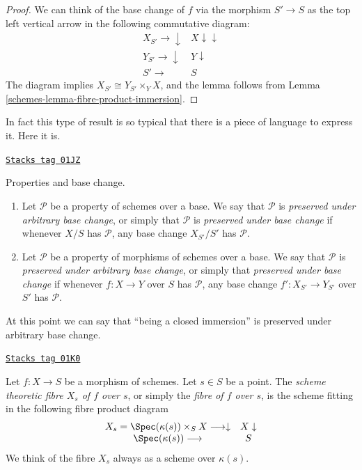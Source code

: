 \begin{proof}

We can think of the base change of $f$ via the morphism
$S' \to S$ as the top left vertical arrow in the following
commutative diagram:
$$
\begin{array}{cc}X_{S'} \longrightarrow\downarrow & X \downarrow\downarrow \\ Y_{S'} \longrightarrow\downarrow & Y \downarrow \\ S' \longrightarrow & S\end{array}
$$
The diagram implies $X_{S'} \cong Y_{S'} \times_Y X$,
and the lemma follows from Lemma \ref{schemes-lemma-fibre-product-immersion}.
\end{proof}

In fact this type of result is so typical that there is a
piece of language to express it. Here it is.

\begin{definition}
\label{schemes-definition-preserved-by-base-change}
\href{https://stacks.math.columbia.edu/tag/01JZ}{\texttt{Stacks tag 01JZ}}

Properties and base change.
\begin{enumerate}
\item Let $\mathcal{P}$ be a property of schemes over a base.
We say that $\mathcal{P}$ is {\it preserved under arbitrary base change},
or simply that $\mathcal{P}$ is {\it preserved under base change}
if whenever $X/S$
has $\mathcal{P}$, any base change $X_{S'}/S'$ has $\mathcal{P}$.
\item Let $\mathcal{P}$ be a property of morphisms of schemes over a base.
We say that $\mathcal{P}$ is {\it preserved under arbitrary base change},
or simply that {\it preserved under base change} if whenever
$f : X \to Y$ over $S$ has $\mathcal{P}$, any base change
$f' : X_{S'} \to Y_{S'}$ over $S'$ has $\mathcal{P}$.
\end{enumerate}
\end{definition}

At this point we can say that ``being a closed immersion'' is
preserved under arbitrary base change.

\begin{definition}[Fibre]
\label{schemes-definition-fibre}
\href{https://stacks.math.columbia.edu/tag/01K0}{\texttt{Stacks tag 01K0}}

Let $f : X \to S$ be a morphism of schemes.
Let $s \in S$ be a point.
The {\it scheme theoretic fibre $X_s$ of $f$ over $s$},
or simply the {\it fibre of $f$ over $s$},
is the scheme fitting in the following fibre product diagram
$$
\begin{array}{cc}X_s = \Spec(\kappa(s)) \times_S X \longrightarrow\downarrow & X \downarrow \\ \Spec(\kappa(s)) \longrightarrow & S\end{array}
$$
We think of the fibre $X_s$ always as a scheme over $\kappa(s)$.
\end{definition}

